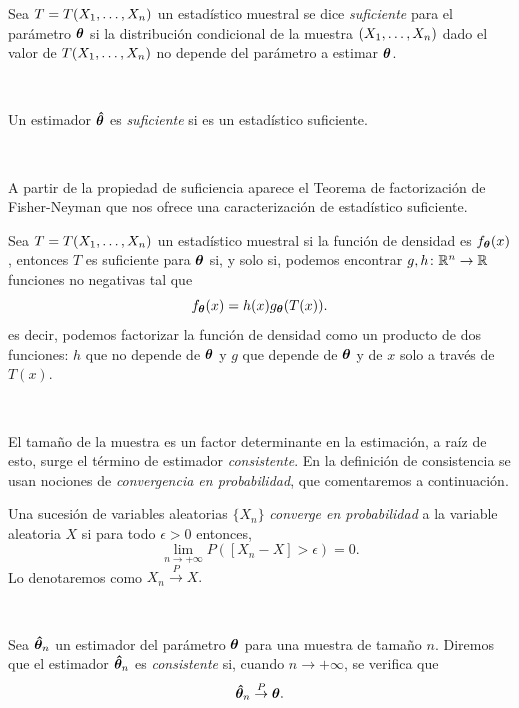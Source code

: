 \documentclass[oneside,openright,titlepage,numbers=noenddot,openany,headinclude,footinclude=true,
cleardoublepage=empty,abstractoff,BCOR=5mm,paper=a4,fontsize=12pt,main=spanish]{scrreprt}
\begin{document}
\begin{definition}
Sea $T=T(X_1,\dots,X_n)$ un estadístico muestral se dice \textit{suficiente} para el parámetro $\bm{\theta}$ si la distribución condicional de la muestra $(X_1,\dots,X_n)$ dado el valor de $T(X_1,\dots,X_n)$ no depende del parámetro a estimar $\bm{\theta}$.
\end{definition}\


\begin{definition}
Un estimador $\bm{\hat{\theta}}$ es \textit{suficiente} si es un estadístico suficiente.
\end{definition}\

A partir de la propiedad de suficiencia aparece el Teorema de factorización de Fisher-Neyman que nos ofrece una caracterización de estadístico suficiente.\\


\begin{theorem}
Sea $T=T(X_1,\dots,X_n)$ un estadístico muestral si la función de densidad es $f_{\bm{\theta}}(x)$, entonces $T$ es suficiente para $\bm{\theta}$ si, y solo si, podemos encontrar $g,h\colon \mathbb{R}^n \to \mathbb{R}$ funciones no negativas tal que $$f_{\bm{\theta}}(x)=h(x)g_{\bm{\theta}}(T(x)).$$
es decir, podemos factorizar la función de densidad como un producto de dos funciones: $h$ que no depende de $\bm{\theta}$ y $g$ que depende de $\bm{\theta}$ y de $x$ solo a través de $T(x)$.
\end{theorem}\

El tamaño de la muestra es un factor determinante en la estimación, a raíz de esto, surge el término de estimador \textit{consistente}. En la definición de consistencia se usan nociones de \textit{convergencia en probabilidad}, que comentaremos a continuación.\\

\begin{definition}
Una sucesión de variables aleatorias $\{X_n\}$ \textit{converge en probabilidad} a la variable aleatoria $X$ si para todo $\epsilon>0$ entonces, $$\lim_{n\to +\infty}P([X_n-X]>\epsilon)=0.$$
Lo denotaremos como $X_n \overset{P}{\to} X.$
\end{definition}\

\begin{definition}
Sea $\bm{\hat{\theta}}_n$ un estimador del parámetro $\bm{\theta}$ para una muestra de tamaño $n$. Diremos que el estimador $\bm{\hat{\theta}}_n$ es \textit{consistente} si, cuando $n\to +\infty$, se verifica que $$\bm{\hat{\theta}}_n \overset{P}{\to} \bm{\theta}.$$
\end{definition}\
\end{document}

